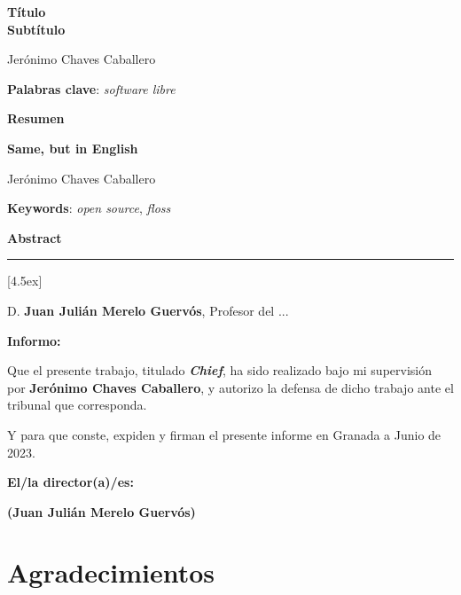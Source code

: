 \thispagestyle{empty}

\begin{center}
{\large\bfseries Título \\ Subtítulo }\\	%
\end{center}
\begin{center}
Jerónimo Chaves Caballero\\
\end{center}


\vspace{0.5cm}
\noindent\textbf{Palabras clave}: \textit{software libre}
\vspace{0.7cm}

\noindent\textbf{Resumen}
	

\cleardoublepage

\begin{center}
	{\large\bfseries Same, but in English}\\	%
\end{center}
\begin{center}
	Jerónimo Chaves Caballero\\
\end{center}
\vspace{0.5cm}
\noindent\textbf{Keywords}: \textit{open source}, \textit{floss}
\vspace{0.7cm}

\noindent\textbf{Abstract}


\cleardoublepage

\thispagestyle{empty}

\noindent\rule[-1ex]{\textwidth}{2pt}[4.5ex]

D. \textbf{Juan Julián Merelo Guervós}, Profesor del ...	%

\vspace{0.5cm}

\textbf{Informo:}

\vspace{0.5cm}

Que el presente trabajo, titulado \textit{\textbf{Chief}},	%
ha sido realizado bajo mi supervisión por \textbf{Jerónimo Chaves Caballero}, y autorizo la defensa de dicho trabajo ante el tribunal
que corresponda.

\vspace{0.5cm}

Y para que conste, expiden y firman el presente informe en Granada a Junio de 2023.

\vspace{1cm}

\textbf{El/la director(a)/es: }

\vspace{5cm}

\noindent \textbf{(Juan Julián Merelo Guervós)}

\chapter*{Agradecimientos}




